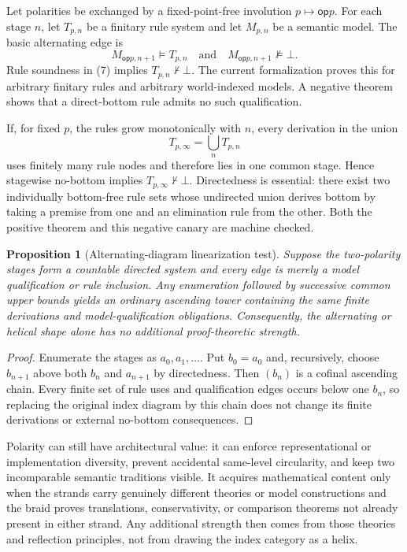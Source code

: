 \documentclass[11pt]{article}
\newtheorem{proposition}[theorem]{Proposition}
\theoremstyle{definition}
\theoremstyle{remark}
\newcommand{\op}{\mathsf{op}}
\begin{document}
Let polarities be exchanged by a fixed-point-free involution $p\mapsto\op p$.
For each stage $n$, let $T_{p,n}$ be a finitary rule system and let
$M_{p,n}$ be a semantic model.  The basic alternating edge is
\[
  M_{\op p,n+1}\models T_{p,n}
  \quad\text{and}\quad
  M_{\op p,n+1}\not\models\bot.                           \tag{7}
\]
Rule soundness in (7) implies $T_{p,n}\nvdash\bot$.  The current formalization
proves this for arbitrary finitary rules and arbitrary world-indexed models.  A
negative theorem shows that a direct-bottom rule admits no such qualification.

If, for fixed $p$, the rules grow monotonically with $n$, every derivation in the
union
\[
  T_{p,\infty}=\bigcup_n T_{p,n}
\]
uses finitely many rule nodes and therefore lies in one common stage.  Hence
stagewise no-bottom implies $T_{p,\infty}\nvdash\bot$.  Directedness is essential:
there exist two individually bottom-free rule sets whose undirected union derives
bottom by taking a premise from one and an elimination rule from the other.  Both
the positive theorem and this negative canary are machine checked.

\begin{proposition}[Alternating-diagram linearization test]
Suppose the two-polarity stages form a countable directed system and every
edge is merely a model qualification or rule inclusion.  Any enumeration followed
by successive common upper bounds yields an ordinary ascending tower containing
the same finite derivations and model-qualification obligations.  Consequently,
the alternating or helical shape alone has no additional proof-theoretic strength.
\end{proposition}

\begin{proof}
Enumerate the stages as $a_0,a_1,\ldots$.  Put $b_0=a_0$ and, recursively, choose
$b_{n+1}$ above both $b_n$ and $a_{n+1}$ by directedness.  Then $(b_n)$ is a
cofinal ascending chain.  Every finite set of rule uses and qualification edges
occurs below one $b_n$, so replacing the original index diagram by this chain
does not change its finite derivations or external no-bottom consequences.
\end{proof}

Polarity can still have architectural value: it can enforce representational or
implementation diversity, prevent accidental same-level circularity, and keep two
incomparable semantic traditions visible.  It acquires mathematical content only
when the strands carry genuinely different theories or model constructions and
the braid proves translations, conservativity, or comparison theorems not already
present in either strand.  Any additional strength then comes from those theories
and reflection principles, not from drawing the index category as a helix.
\end{document}

